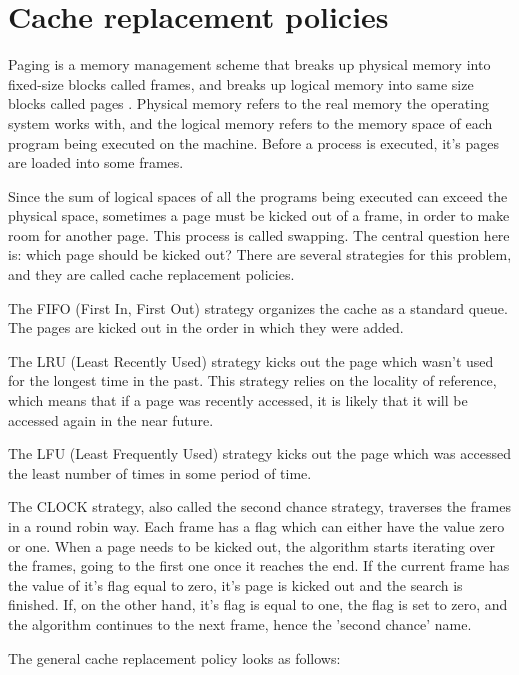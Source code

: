\section{Cache replacement policies}
Paging is a memory management scheme that breaks up physical memory into fixed-size blocks called frames, and breaks up logical memory into same size blocks called pages \citep{silberschatz2018operatingsystem}. Physical memory refers to the real memory the operating system works with, and the logical memory refers to the memory space of each program being executed on the machine. Before a process is executed, it's pages are loaded into some frames.

Since the sum of logical spaces of all the programs being executed can exceed the physical space, sometimes a page must be kicked out of a frame, in order to make room for another page. This process is called swapping. The central question here is: which page should be kicked out? There are several strategies for this problem, and they are called cache replacement policies.

The FIFO (First In, First Out) strategy organizes the cache as a standard queue. The pages are kicked out in the order in which they were added.

The LRU (Least Recently Used) strategy kicks out the page which wasn't used for the longest time in the past. This strategy relies on the locality of reference, which means that if a page was recently accessed, it is likely that it will be accessed again in the near future.

The LFU (Least Frequently Used) strategy kicks out the page which was accessed the least number of times in some period of time.

The CLOCK strategy, also called the second chance strategy, traverses the frames in a round robin way. Each frame has a flag which can either have the value zero or one. When a page needs to be kicked out, the algorithm starts iterating over the frames, going to the first one once it reaches the end. If the current frame has the value of it's flag equal to zero, it's page is kicked out and the search is finished. If, on the other hand, it's flag is equal to one, the flag is set to zero, and the algorithm continues to the next frame, hence the 'second chance' name.

The general cache replacement policy looks as follows:

